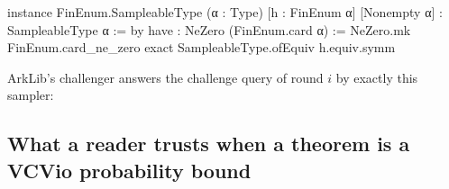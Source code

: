 

\begin{leancode}
instance FinEnum.SampleableType (α : Type)
    [h : FinEnum α] [Nonempty α] : SampleableType α := by
  have : NeZero (FinEnum.card α) := NeZero.mk FinEnum.card_ne_zero
  exact SampleableType.ofEquiv h.equiv.symm
\end{leancode}


ArkLib's challenger answers the challenge query of round $i$ by exactly this sampler:



\subsection{What a reader trusts when a theorem is a VCVio probability bound}\label{sec:gen-lib-vcvio-trust}

